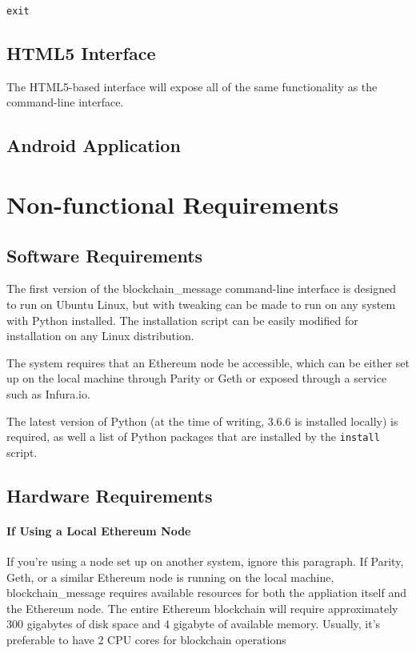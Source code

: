 \documentclass[titlepage]{report}
\begin{document}
\texttt{exit}

\subsection{HTML5 Interface}
The HTML5-based interface will expose all of the same functionality as the command-line interface.

\subsection{Android Application}

\section{Non-functional Requirements}
\subsection{Software Requirements}
The first version of the blockchain\_message command-line interface is designed to run on Ubuntu Linux, but with tweaking can be made to run on any system with Python installed. The installation script can be easily modified for installation on any Linux distribution.

The system requires that an Ethereum \gls{node} be accessible, which can be either set up on the local machine through Parity or Geth or exposed through a service such as Infura.io.

The latest version of Python (at the time of writing, 3.6.6 is installed locally) is required, as well a list of Python packages that are installed by the \texttt{install} script.

\subsection{Hardware Requirements}
\paragraph{If Using a Local Ethereum Node}
If you're using a node set up on another system, ignore this paragraph. If Parity, Geth, or a similar Ethereum node is running on the local machine, blockchain\_message requires available resources for both the appliation itself and the Ethereum node. The entire Ethereum blockchain will require approximately 300 gigabytes of disk space and 4 gigabyte of available memory. Usually, it's preferable to have 2 CPU cores for blockchain operations
\end{document}
